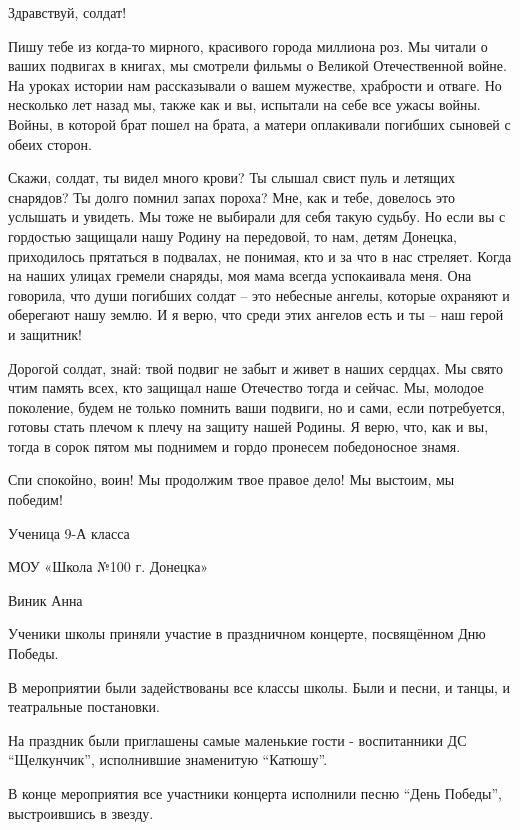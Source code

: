 \begin{zzquote}
Здравствуй, солдат!

Пишу тебе из когда-то мирного, красивого города миллиона роз. Мы читали о ваших
подвигах в книгах, мы смотрели фильмы о Великой Отечественной войне. На уроках
истории нам рассказывали о вашем мужестве, храбрости и отваге. Но несколько лет
назад мы, также как и вы, испытали на себе все ужасы войны. Войны, в которой
брат пошел на брата, а матери оплакивали погибших сыновей с обеих сторон.

Скажи, солдат, ты видел много крови? Ты слышал свист пуль и летящих снарядов?
Ты долго помнил запах пороха? Мне, как и тебе, довелось это услышать и увидеть.
Мы тоже не выбирали для себя такую судьбу. Но если вы с гордостью защищали нашу
Родину на передовой, то нам, детям Донецка, приходилось прятаться в подвалах,
не понимая, кто и за что в нас стреляет. Когда на наших улицах гремели снаряды,
моя мама всегда успокаивала меня. Она говорила, что души погибших солдат – это
небесные ангелы, которые охраняют и оберегают нашу землю. И я верю, что среди
этих ангелов есть и ты – наш герой и защитник!

Дорогой солдат, знай: твой подвиг не забыт и живет в наших сердцах. Мы свято
чтим память всех, кто защищал наше Отечество тогда и сейчас. Мы, молодое
поколение, будем не только помнить ваши подвиги, но и сами, если потребуется,
готовы стать плечом к плечу на защиту нашей Родины. Я верю, что, как и вы,
тогда в сорок пятом мы поднимем и гордо пронесем победоносное знамя.

Спи спокойно, воин! Мы продолжим твое правое дело! Мы выстоим, мы победим!

Ученица 9-А класса

МОУ «Школа №100 г. Донецка»

Виник Анна
\end{zzquote}



Ученики школы приняли участие в праздничном концерте, посвящённом Дню Победы.

В мероприятии были задействованы все классы школы. Были и песни, и танцы, и
театральные постановки.

На праздник были приглашены самые маленькие гости - воспитанники ДС
\enquote{Щелкунчик}, исполнившие знаменитую \enquote{Катюшу}.

В конце мероприятия все участники концерта исполнили песню \enquote{День
Победы}, выстроившись в звезду.

